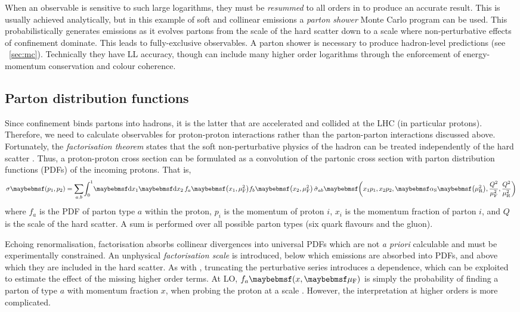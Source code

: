 When an observable is sensitive to such large logarithms, they must be \textit{resummed} 
to all orders in \alphaS to produce an accurate result. This is usually achieved 
analytically, but in this example of soft and collinear emissions a \textit{parton 
shower} Monte Carlo program can be used. This probabilistically generates emissions as it 
evolves partons from the scale of the hard scatter down to a scale where non-perturbative 
effects of confinement dominate. This leads to fully-exclusive observables. A parton 
shower is necessary to produce hadron-level predictions (see \Section~\ref{sec:mc}). 
Technically they have LL accuracy, though can include many higher order logarithms 
through the enforcement of energy-momentum conservation and colour coherence.



\subsection{Parton distribution functions}
\label{sec:qcd:pdf}

Since confinement binds partons into hadrons, it is the latter that are accelerated and 
collided at the LHC (in particular protons). Therefore, we need to calculate 
observables for proton-proton interactions rather than the parton-parton interactions 
discussed above. Fortunately, the \textit{factorisation theorem} states that the soft 
non-perturbative physics of the hadron can be treated independently of the hard scatter 
\cite{Collins:1982}. Thus, a proton-proton cross section can be formulated as a 
convolution of the partonic cross section with parton distribution functions (PDFs) of 
the incoming protons. That is,
\begin{equation}
	\sigma\parenths{p_1, p_2} = 
	\sum\limits_{a, b} \! \int_0^1 \! \d{x_1} \d{x_2} \,
	f_a \parenths{x_1, \mu_{\text{F}}^2} f_b \parenths{x_2, \mu_{\text{F}}^2} \,
	\hat{\sigma}_{ab} \parenths{x_1 p_1, x_2 p_2, \alphaS\parenths{\mu_{\text{R}}^2}, 
	\frac{Q^2}{\mu_{\text{F}}^2}, \frac{Q^2}{\mu_{\text{R}}^2}} 
\end{equation}
where $f_a$ is the PDF of parton type $a$ within the proton, $p_i$ is the momentum 
of proton $i$, $x_i$ is the momentum fraction of parton $i$, and $Q$ is the scale of the 
hard scatter. A sum is performed over all possible parton types (six quark flavours and 
the gluon).

Echoing renormalisation, factorisation absorbs collinear divergences into universal 
PDFs which are not \textit{a priori} calculable and must be experimentally 
constrained. An unphysical \textit{factorisation scale} \muf is introduced, 
below which emissions are absorbed into PDFs, and above which they are included in 
the hard scatter. As with \mur, truncating the perturbative series introduces a 
\muf dependence, which can be exploited to estimate the effect of the missing higher 
order terms. At LO, $f_a \parenths{x, \muf}$ is simply the probability of finding a 
parton of type $a$ with momentum fraction $x$, when probing the proton at a scale \muf.
However, the interpretation at higher orders is more complicated.

